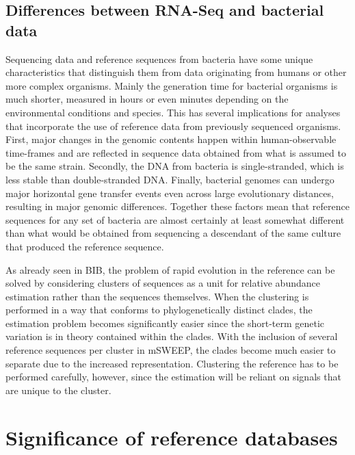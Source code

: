\documentclass[officiallayout]{tktla}
\begin{document}
\subsection{Differences between RNA-Seq and bacterial data}
\label{section:bacterial-data}

Sequencing data and reference sequences from bacteria have some unique
characteristics that distinguish them from data originating from
humans or other more complex organisms. Mainly the generation time for
bacterial organisms is much shorter, measured in hours or even minutes
depending on the environmental conditions and species. This has
several implications for analyses that incorporate the use of
reference data from previously sequenced organisms. First, major
changes in the genomic contents happen within human-observable
time-frames and are reflected in sequence data obtained from what is
assumed to be the same strain. Secondly, the DNA from bacteria is
single-stranded, which is less stable than double-stranded
DNA. Finally, bacterial genomes can undergo major horizontal gene
transfer events even across large evolutionary distances, resulting in
major genomic differences. Together these factors mean that reference
sequences for any set of bacteria are almost certainly at least
somewhat different than what would be obtained from sequencing a
descendant of the same culture that produced the reference sequence.

As already seen in BIB, the problem of rapid evolution in the
reference can be solved by considering clusters of sequences as a unit
for relative abundance estimation rather than the sequences
themselves. When the clustering is performed in a way that conforms to
phylogenetically distinct clades, the estimation problem becomes
significantly easier since the short-term genetic variation is in
theory contained within the clades. With the inclusion of several
reference sequences per cluster in mSWEEP, the clades become much
easier to separate due to the increased representation. Clustering the
reference has to be performed carefully, however, since the estimation
will be reliant on signals that are unique to the cluster.

\section{Significance of reference databases}
\end{document}
